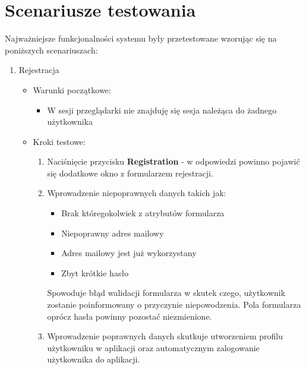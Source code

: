 \section{Scenariusze testowania}
Najważniejsze funkcjonalności systemu były przetestowane wzorując się na poniższych scenariuszach:
 \begin{enumerate}
 \item Rejestracja
 \begin{itemize}
 \item Warunki początkowe:
 \begin{itemize}
 \item W sesji przeglądarki nie znajduję się sesja należąca do żadnego użytkownika
 \end{itemize}
 \item Kroki testowe:
 \begin{enumerate}
 \item Naciśnięcie przycisku \textbf{Registration} - w odpowiedzi powinno pojawić się dodatkowe okno z formularzem rejestracji.
 \item Wprowadzenie niepoprawnych danych takich jak:
 \begin{itemize}
 \item Brak któregokolwiek z atrybutów formularza
 \item Niepoprawny adres mailowy
 \item Adres mailowy jest już wykorzystany
 \item Zbyt krótkie hasło
 \end{itemize}
 Spowoduje błąd walidacji formularza w skutek czego, użytkownik zostanie poinformowany o przyczynie niepowodzenia. Pola formularza oprócz hasła powinny pozostać niezmienione.
 \item Wprowadzenie poprawnych danych skutkuje utworzeniem profilu użytkowniku w aplikacji oraz automatycznym zalogowanie użytkownika do aplikacji.
 \end{enumerate}
 \end{itemize}


\end{enumerate}
